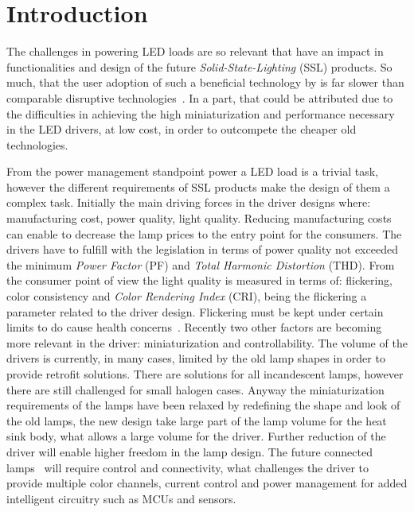 \chapter{Introduction}

The challenges in powering LED loads are so relevant that have an impact in functionalities and design of the future \emph{Solid-State-Lighting} (SSL) products. So much, that the user adoption of such a beneficial technology by is far slower than comparable disruptive technologies~\cite{11Voger}. In a part, that could be attributed due to the difficulties in achieving the high miniaturization and performance necessary in the LED drivers, at low cost, in order to outcompete the cheaper old technologies.

From the power management standpoint power a LED load is a trivial task, however the different requirements of SSL products make the design of them a complex task. Initially the main driving forces in the driver designs where: manufacturing cost, power quality, light quality. Reducing manufacturing costs can enable to decrease the lamp prices to the entry point for the consumers. The drivers have to fulfill with the legislation in terms of power quality not exceeded the minimum \emph{Power Factor} (PF) and \emph{Total Harmonic Distortion} (THD). From the consumer point of view the light quality is measured in terms of: flickering, color consistency and \emph{Color Rendering Index} (CRI), being the flickering a parameter related to the driver design. Flickering must be kept  under certain limits to do cause health concerns~\cite{10Wilkins}.
Recently two other factors are becoming more relevant in the driver: miniaturization and  controllability. The volume of the drivers is currently, in many cases, limited by the old lamp shapes in order to provide retrofit solutions. There are solutions for all incandescent lamps, however there are still challenged for small halogen cases. Anyway the miniaturization requirements of the lamps have been relaxed by redefining the shape and look of the old lamps, the new design take large part of the lamp volume for the heat sink body, what allows a large volume for the driver. Further reduction of the driver will enable higher freedom in the lamp design. The future connected lamps~\cite{14Harbers} will require control and connectivity, what challenges the driver to provide multiple color channels, current control and power management for added intelligent circuitry such as MCUs and sensors.

